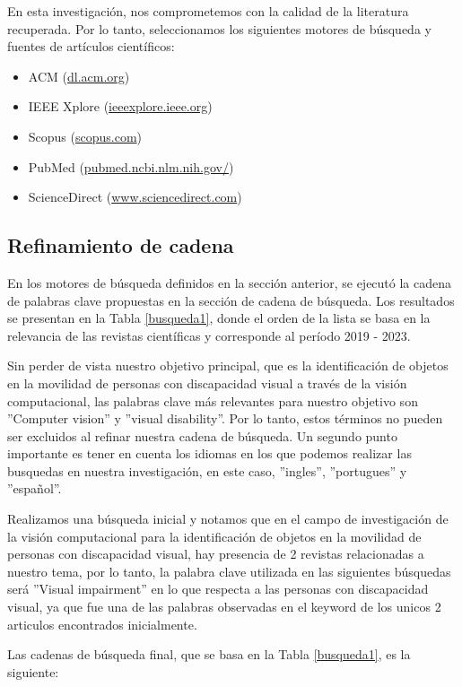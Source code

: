\documentclass[letterpaper]{article}
\begin{document}
En esta investigación, nos comprometemos con la calidad de la literatura recuperada. Por lo tanto, seleccionamos los siguientes motores de búsqueda y fuentes de artículos científicos:
	\begin{itemize}
	    \item ACM (\url{dl.acm.org})
        \item IEEE Xplore (\url{ieeexplore.ieee.org})
        \item Scopus (\url{scopus.com})
        \item PubMed (\url{pubmed.ncbi.nlm.nih.gov/})
        \item ScienceDirect (\url{www.sciencedirect.com})
    \end{itemize}
    
	\subsection{Refinamiento de cadena}
	En los motores de búsqueda definidos en la sección anterior, se ejecutó la cadena de palabras clave propuestas en la sección de cadena de búsqueda. Los resultados se presentan en la Tabla \ref{busqueda1}, donde el orden de la lista se basa en la relevancia de las revistas científicas y corresponde al período 2019 - 2023.
 
Sin perder de vista nuestro objetivo principal, que es la identificación de objetos en la movilidad de personas con discapacidad visual a través de la visión computacional, las palabras clave más relevantes para nuestro objetivo son ''Computer vision'' y ''visual disability''. Por lo tanto, estos términos no pueden ser excluidos al refinar nuestra cadena de búsqueda. Un segundo punto importante es tener en cuenta los idiomas en los que podemos realizar las busquedas en nuestra investigación, en este caso, ''ingles'', ''portugues'' y ''español''. 

Realizamos una búsqueda inicial y notamos que en el campo de investigación de la visión computacional para la identificación de objetos en la movilidad de personas con discapacidad visual, hay presencia de 2  revistas relacionadas a nuestro tema, por lo tanto, la palabra clave utilizada en las siguientes búsquedas será ''Visual impairment'' en lo que respecta a las personas con discapacidad visual, ya que fue una de las palabras observadas en el keyword de los unicos 2 articulos encontrados inicialmente.

Las cadenas de búsqueda final, que se basa en la Tabla \ref{busqueda1}, es la siguiente:
\end{document}
